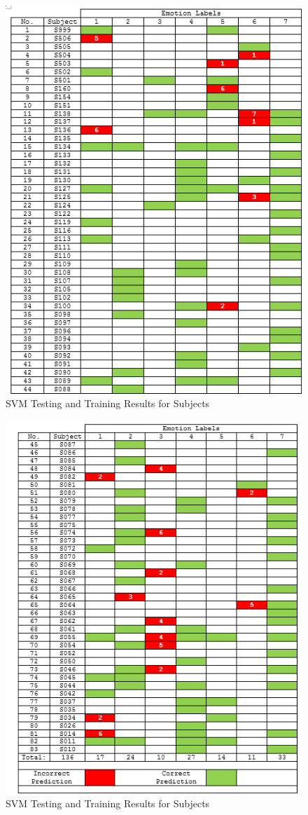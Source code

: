 \begin{figure}[H]
  \centering
  \includegraphics[scale=1.5]{res1}
  \caption{SVM Testing and Training Results for Subjects}
  \label{fig: res1}
\end{figure} 
\begin{figure}[H]
  \centering
  \includegraphics[scale=1.5]{res2}
  \caption{SVM Testing and Training Results for Subjects}
  \label{fig: res2}
\end{figure} 


